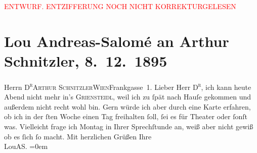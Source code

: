 
\begin{center}
            \textcolor{red}{ENTWURF. ENTZIFFERUNG NOCH NICHT KORREKTURGELESEN}
                      \end{center}
            
               \section[Lou Andreas-Salomé an Arthur Schnitzler, 8. 12. 1895]{ Lou Andreas-Salomé an Arthur Schnitzler, 8. 12. 1895}\nopagebreak{}\rehead{ }\begin{ledgroupsized}[t]{13cm}\normalsize\beginnumbering{} \toendnotes[C]{\smallbreak\pagebreak[2]} 
\pstart{}{\pb}Herrn \textsc{D\textsuperscript{r}}\pend{}\pstart{}\textsc{Arthur Schnitzler}\pend{}\pstart{}\textsc{Wien}\pend{}\pstart{}Frankgasse 1.
                    \pend{}{\bigskip}\pstart
           \noindent{}{\pb}Lieber Herr \textsc{D\textsuperscript{r}}, ich kann heute Abend nicht mehr in’s \textsc{Griensteidl}, weil ich zu ſpät nach Hauſe gekommen und außerdem nicht recht wohl
                    bin. Gern würde ich aber durch eine Karte erfahren, ob ich in der \damage{\textcolor{gray}{näch}}ſten Woche einen Tag freihalten ſoll, ſei es für Theater oder ſonſt
                    was. Vielleicht frage ich  Montag in Ihrer
                    Sprechſtunde an, weiß aber nicht gewiß ob es ſich ſo macht.\pend
           \pstart
           Mit herzlichen Grüßen Ihre{\\[\baselineskip]}\spacefill\mbox{LouAS.}\pend
           \leftskip=0em{}\endnumbering{}\end{ledgroupsized}  \newcommand{\dateiname}{L00520}\newcommand{\titel}{Lou Andreas-Salomé an Arthur Schnitzler, 8. 12. 1895}\newcommand{\editorInnen}{Martin Anton Müller und Gerd-Hermann Susen}
      